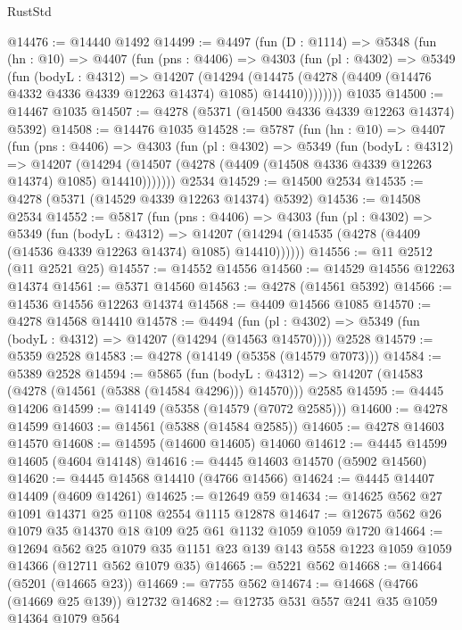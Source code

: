 \begin{lexlean}{RustStd}
\begin{coremodule}
@14476 := @14440 @1492
@14499 := @4497
    (fun (D : @1114) =>
    @5348
      (fun (hn : @10) =>
      @4407
        (fun (pns : @4406) =>
        @4303
          (fun (pl : @4302) =>
          @5349
            (fun (bodyL : @4312) =>
            @14207
              (@14294
                (@14475 (@4278 (@4409 (@14476 @4332 @4336 @4339 @12263 @14374) @1085) @14410))))))))
    @1035
@14500 := @14467 @1035
@14507 := @4278 (@5371 (@14500 @4336 @4339 @12263 @14374) @5392)
@14508 := @14476 @1035
@14528 := @5787
    (fun (hn : @10) =>
    @4407
      (fun (pns : @4406) =>
      @4303
        (fun (pl : @4302) =>
        @5349
          (fun (bodyL : @4312) =>
          @14207
            (@14294 (@14507 (@4278 (@4409 (@14508 @4336 @4339 @12263 @14374) @1085) @14410)))))))
    @2534
@14529 := @14500 @2534
@14535 := @4278 (@5371 (@14529 @4339 @12263 @14374) @5392)
@14536 := @14508 @2534
@14552 := @5817
    (fun (pns : @4406) =>
    @4303
      (fun (pl : @4302) =>
      @5349
        (fun (bodyL : @4312) =>
        @14207 (@14294 (@14535 (@4278 (@4409 (@14536 @4339 @12263 @14374) @1085) @14410))))))
@14556 := @11 @2512 (@11 @2521 @25)
@14557 := @14552 @14556
@14560 := @14529 @14556 @12263 @14374
@14561 := @5371 @14560
@14563 := @4278 (@14561 @5392)
@14566 := @14536 @14556 @12263 @14374
@14568 := @4409 @14566 @1085
@14570 := @4278 @14568 @14410
@14578 := @4494
    (fun (pl : @4302) => @5349 (fun (bodyL : @4312) => @14207 (@14294 (@14563 @14570))))
    @2528
@14579 := @5359 @2528
@14583 := @4278 (@14149 (@5358 (@14579 @7073)))
@14584 := @5389 @2528
@14594 := @5865
    (fun (bodyL : @4312) => @14207 (@14583 (@4278 (@14561 (@5388 (@14584 @4296))) @14570)))
    @2585
@14595 := @4445 @14206
@14599 := @14149 (@5358 (@14579 (@7072 @2585)))
@14600 := @4278 @14599
@14603 := @14561 (@5388 (@14584 @2585))
@14605 := @4278 @14603 @14570
@14608 := @14595 (@14600 @14605) @14060
@14612 := @4445 @14599 @14605 (@4604 @14148)
@14616 := @4445 @14603 @14570 (@5902 @14560)
@14620 := @4445 @14568 @14410 (@4766 @14566)
@14624 := @4445 @14407 @14409 (@4609 @14261)
@14625 := @12649 @59
@14634 := @14625 @562 @27 @1091 @14371 @25 @1108 @2554 @1115 @12878
@14647 := @12675 @562 @26 @1079 @35 @14370 @18 @109 @25 @61 @1132 @1059 @1059 @1720
@14664 := @12694
    @562
    @25
    @1079
    @35
    @1151
    @23
    @139
    @143
    @558
    @1223
    @1059
    @1059
    @14366
    (@12711 @562 @1079 @35)
@14665 := @5221 @562
@14668 := @14664 (@5201 (@14665 @23))
@14669 := @7755 @562
@14674 := @14668 (@4766 (@14669 @25 @139)) @12732
@14682 := @12735 @531 @557 @241 @35 @1059 @14364 @1079 @564

\end{coremodule}
\end{lexlean}
